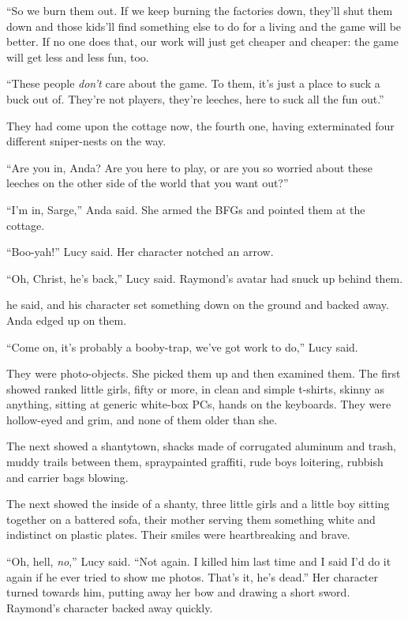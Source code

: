 “So we burn them out. If we keep burning the factories down,
they’ll shut them down and those kids’ll find something else to do
for a living and the game will be better. If no one does that, our
work will just get cheaper and cheaper: the game will get less and
less fun, too.

“These people \emph{don’t} care about the game. To them, it’s just
a place to suck a buck out of. They’re not players, they’re
leeches, here to suck all the fun out.”

They had come upon the cottage now, the fourth one, having
exterminated four different sniper-nests on the way.

“Are you in, Anda? Are you here to play, or are you so worried
about these leeches on the other side of the world that you want
out?”

“I’m in, Sarge,” Anda said. She armed the BFGs and pointed them at
the cottage.

“Boo-yah!” Lucy said. Her character notched an arrow.

“Oh, Christ, he’s back,” Lucy said. Raymond’s avatar had snuck up
behind them.

he said, and his character set something down on the ground and
backed away. Anda edged up on them.

“Come on, it’s probably a booby-trap, we’ve got work to do,” Lucy
said.

They were photo-objects. She picked them up and then examined them.
The first showed ranked little girls, fifty or more, in clean and
simple t-shirts, skinny as anything, sitting at generic white-box
PCs, hands on the keyboards. They were hollow-eyed and grim, and
none of them older than she.

The next showed a shantytown, shacks made of corrugated aluminum
and trash, muddy trails between them, spraypainted graffiti, rude
boys loitering, rubbish and carrier bags blowing.

The next showed the inside of a shanty, three little girls and a
little boy sitting together on a battered sofa, their mother
serving them something white and indistinct on plastic plates.
Their smiles were heartbreaking and brave.

“Oh, hell, \emph{no},” Lucy said. “Not again. I killed him last
time and I said I’d do it again if he ever tried to show me photos.
That’s it, he’s dead.” Her character turned towards him, putting
away her bow and drawing a short sword. Raymond’s character backed
away quickly.

